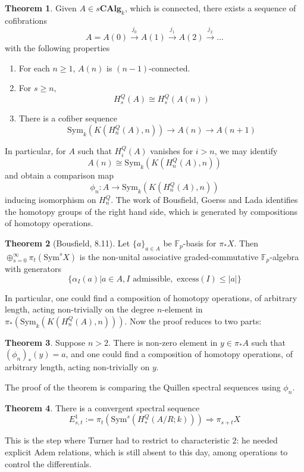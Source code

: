 \documentclass{article}
\newcommand{\Sym}{\textrm{Sym}}
\theoremstyle{definition}
\newtheorem{theorem}{Theorem}[section]
\theoremstyle{definition}
\theoremstyle{definition}
\theoremstyle{definition}
\theoremstyle{definition}
\theoremstyle{definition}
\theoremstyle{definition}
\theoremstyle{definition}
\begin{document}
\begin{theorem}
    Given $A\in s \textbf{CAlg}_k$, which is connected, there exists a sequence of cofibrations 
    \[A=A(0)\xrightarrow{j_0} A(1)\xrightarrow{j_1} A(2)\xrightarrow{j_2}...\]
    with the following properties
    \begin{enumerate}
        \item For each $n\geq 1$, $A(n)$ is $(n-1)$-connected.
        \item For $s\geq n$, 
         \[H_s^Q(A)\cong H_s^Q(A(n))\]
        \item There is a cofiber sequence 
        \[ \textrm{Sym}_k(K(H_n^Q(A),n))\to A(n)\to A(n+1) \]
    \end{enumerate}
\end{theorem}
In particular, for $A$ such that $H_i^Q(A)$ vanishes for $i>n$, we may identify 
\[A(n)\cong \textrm{Sym}_k(K(H_n^Q(A),n))\]
and obtain a comparison map 
\[\phi_n: A\to \textrm{Sym}_k(K(H_n^Q(A),n))\]
inducing isomorphism on $H_n^Q$. The work of Bousfield, Goerss and Lada identifies the homotopy groups of the right hand side, which is generated by compositions of homotopy operations.

\begin{theorem}[Bousfield, 8.11]
    Let $\{a\}_{a\in A}$ be $\mathbb{F}_p$-basis for $\pi_*X$. Then $\oplus_{s=0}^{\infty} \pi_t(\Sym^s X)$ is the non-unital associative graded-commutative $\mathbb{F}_p$-algebra with generators 
    \[\{\alpha_{I}(a) | a\in A, I \textrm{ admissible}, \textrm{ excess}(I)\leq |a| \}\]
\end{theorem}
In particular, one could find a composition of homotopy operations, of arbitrary length, acting non-trivially on the degree $n$-element in $\pi_*(\textrm{Sym}_k(K(H_n^Q(A),n)))$. Now the proof reduces to two parts:

\begin{theorem}
    Suppose $n>2$. There is non-zero element in $y\in \pi_* A$ such that $(\phi_n)_*(y)=a$, and one could find a composition of homotopy operations, of arbitrary length, acting non-trivially on $y$.
\end{theorem}
The proof of the theorem is comparing the Quillen spectral sequences using $\phi_n$.
\begin{theorem}
    There is a convergent spectral sequence
    \[E^1_{s,t}:= \pi_t(\Sym^s ( H^Q_*(A/R;k)) )\Rightarrow \pi_{s+t} X\]
\end{theorem}


This is the step where Turner had to restrict to characteristic $2$: he needed explicit Adem relations, which is still absent to this day, among operations to control the differentials. 
\end{document}
